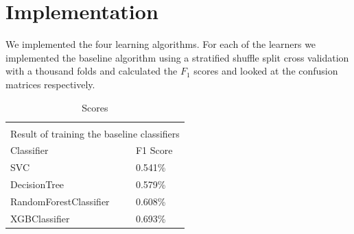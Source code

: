 \section*{Implementation}
We implemented the four learning algorithms. For each of the learners we implemented the baseline algorithm using a stratified shuffle split cross validation with a thousand folds and calculated the $F_1$ scores and looked at the confusion matrices respectively.

\setlength{\extrarowheight}{1.5pt}
\begin{table}[!htbp]
\caption{Scores} %
\centering %
\begin{tabular}{|p{6cm}|p{1.5cm}|} %
\hline %


\multicolumn{2}{|c|}{}\\
\multicolumn{2}{|c|}{Result of training the baseline classifiers}\\[5pt]
\hline
Classifier & F1 Score\\[0.5ex]
\hline %

SVC     & 0.541\% \\
DecisionTree       & 0.579\% \\
RandomForestClassifier   & 0.608\% \\
XGBClassifier            & 0.693\% \\

\hline%
\end{tabular}
\label{tableBenchMarkScores}
\end{table}

